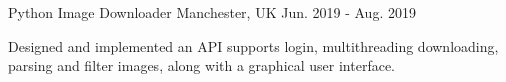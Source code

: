 \begin{cventries}


  \cventry
    {Python} %
    {Image Downloader} %
    {Manchester, UK} %
    {Jun. 2019 - Aug. 2019} %
    {
      \begin{cvitems} %
        \item {Designed and implemented an API supports login, multithreading downloading, parsing and filter images, along with a graphical user interface.}
      \end{cvitems}
    }
  

\end{cventries}
